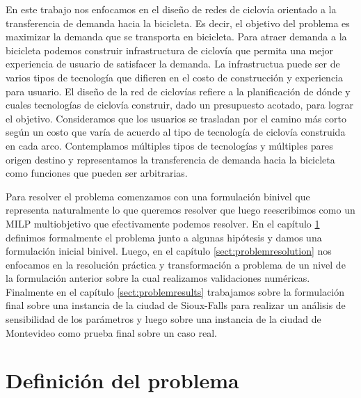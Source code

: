 \documentclass{article}
\begin{document}
  En este trabajo nos enfocamos en el diseño de redes de ciclovía orientado a la transferencia de demanda hacia la bicicleta. Es decir, el objetivo del problema es maximizar la demanda que se transporta en bicicleta. Para atraer demanda a la bicicleta podemos construir infrastructura de ciclovía que permita una mejor experiencia de usuario de satisfacer la demanda. La infrastructua puede ser de varios tipos de tecnología que difieren en el costo de construcción y experiencia para usuario. El diseño de la red de ciclovías refiere a la planificación de dónde y cuales tecnologías de ciclovía construir, dado un presupuesto acotado, para lograr el objetivo. Consideramos que los usuarios se trasladan por el camino más corto según un costo que varía de acuerdo al tipo de tecnología de ciclovía construida en cada arco. Contemplamos múltiples tipos de tecnologías y múltiples pares origen destino y representamos la transferencia de demanda hacia la bicicleta como funciones que pueden ser arbitrarias.

  Para resolver el problema comenzamos con una formulación binivel que representa naturalmente lo que queremos resolver que luego reescribimos como un MILP multiobjetivo que efectivamente podemos resolver. En el capítulo \ref{sect:problemdefinition} definimos formalmente el problema junto a algunas hipótesis y damos una formulación inicial binivel. Luego, en el capítulo \ref{sect:problemresolution} nos enfocamos en la resolución práctica y transformación a problema de un nivel de la formulación anterior sobre la cual realizamos validaciones numéricas. Finalmente en el capítulo \ref{sect:problemresults} trabajamos sobre la formulación final sobre una instancia de la ciudad de Sioux-Falls para realizar un análisis de sensibilidad de los parámetros y luego sobre una instancia de la ciudad de Montevideo como prueba final sobre un caso real.

  \section{Definición del problema}
  \label{sect:problemdefinition}
\end{document}
